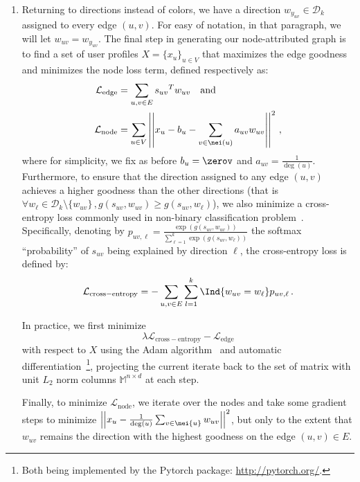 \begin{enumerate}[1),leftmargin=*]
\item
Returning to directions instead of colors, we have a direction $w_{y_{uv}} \in \mathcal{D}_k$
assigned to every edge $(u,v)$. For easy of notation, in that paragraph, we will let $w_{uv} = w_{y_{uv}}$.
The final step in generating our node-attributed graph is to
find a set of user profiles $X=\{x_u\}_{u\in V}$ that maximizes the edge goodness and minimizes the node
loss term, defined respectively as:
\begin{align*}
  \mathcal{L}_{\mathrm{edge}} &=
  \sum_{u,v \in E} {s_{uv}}^T w_{uv} \quad \text{and} \\
  \mathcal{L}_{\mathrm{node}} &=
  \sum_{u\in V} \left|\left| x_u - b_u - \sum_{v \in \nei(u)} a_{uv} w_{uv} \right|\right|^2\,,
\end{align*}
where for simplicity, we fix as before $b_u = \zerov$ and $a_{uv} = \frac{1}{\deg(u)}$. Furthermore, to ensure that the
direction assigned to any edge $(u,v)$ achieves a higher goodness than the other directions (that is
$\forall w_\ell \in \mathcal{D}_k \setminus \{w_{uv}\}\,, g(s_{uv}, w_{uv}) \geq  g(s_{uv},
w_\ell)$), we also minimize a cross-entropy loss commonly used in non-binary classification
problem~\autocite[Section 4.3.4]{PRML06}.  Specifically, denoting by $p_{uv,\ell} = \frac{\exp
\left( g(s_{uv}, w_{uv}) \right)}{\sum_{\ell=1}^k \exp \left( g(s_{uv}, w_\ell) \right)}$ the
softmax \enquote{probability} of $s_{uv}$ being explained by direction $\ell$, the cross-entropy
loss is defined by:
\begin{equation}
  \label{eq:edge_cross}
  \mathcal{L}_{\mathrm{cross-entropy}} = -\sum_{u,v \in E} \sum_{l=1}^k
  \Ind{w_{uv} = w_\ell} p_{uv,\ell}\,.
\end{equation}

In practice, we first minimize
\begin{equation}
  \label{eq:edge_cross_edge}
  \lambda \mathcal{L}_{\mathrm{cross-entropy}} - \mathcal{L}_{\mathrm{edge}}
\end{equation}
with respect to $X$ using the Adam algorithm~\autocite{Adam15} and
automatic differentiation~\autocite{autograd15}\footnote{Both being implemented by the Pytorch
package: \url{http://pytorch.org/}.}, projecting the current iterate back to the set of
matrix with unit $L_2$ norm columns $\mathbb{M}^{n\times d}$ at each step.

Finally, to minimize $\mathcal{L}_{\mathrm{node}}$, we iterate over the nodes and take some gradient
steps to minimize $\left|\left| x_u - \frac{1}{\deg(u)} \sum_{v\in\nei{u}} w_{uv}\right|\right|^2$, but only to the
extent that $w_{uv}$ remains the direction with the highest goodness on the edge $(u,v) \in E$.
\end{enumerate}

